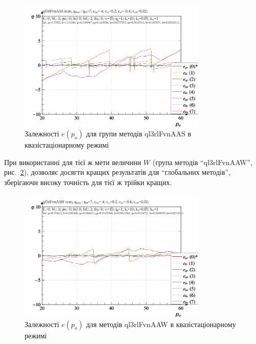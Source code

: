 \begin{figure}[htb!]
  \begin{center}
    \includegraphics[width=0.8\textwidth]{p/scan/qls-p_p_e_ql3rlFvnAAS_scan.png}
  \end{center}
  \caption{Залежності $e(p_o)$ для групи методів ql3rlFvnAAS в квазістаціонарному режимі}
  \label{atu:f:ql3rlFvnAAS_scan}
\end{figure}

При використанні для тієї ж мети величини
$ W $ (група методів ``ql3rlFvnAAW'', рис.~\ref{atu:f:ql3rlFvnAAW_scan}), дозволяє
досягти кращих результатів для ``глобальних методів'',
зберігаючи високу точність для тієї ж трійки кращих.


\begin{figure}[htb!]
  \begin{center}
    \includegraphics[width=0.8\textwidth]{p/scan/qls-p_p_e_ql3rlFvnAAW_scan.png}
  \end{center}
  \caption{Залежності $e(p_o)$ для методів ql3rlFvnAAW в квазістаціонарному режимі}
  \label{atu:f:ql3rlFvnAAW_scan}
\end{figure}

